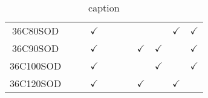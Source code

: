 \begin{table*}[!h]
\begin{tabular}{|c|  c  c  c  c  c   c  c | c  c  c| }
		36C80SOD  &                                                    &                                         & $\checkmark$ &             &              &              &              &              & $\checkmark$ & $\checkmark$ \\
		36C90SOD  &                                                    &                                         & $\checkmark$ &             &              &              & $\checkmark$ & $\checkmark$ &              & $\checkmark$ \\
		36C100SOD &                                                    &                                         & $\checkmark$ &             &              &              &              & $\checkmark$ &              & $\checkmark$ \\
		36C120SOD &                                                    &                                         & $\checkmark$ &             &              &              & $\checkmark$ &              & $\checkmark$ &              \\
		\bottomrule
	\end{tabular}
	\caption{caption}
	\label{tab:restults}
\end{table*}
